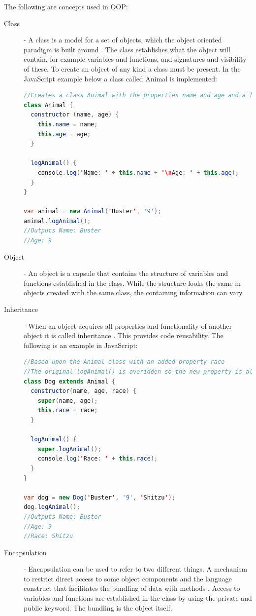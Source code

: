 \documentclass {article}
\begin{document}
The following are concepts used in OOP:
\begin{description}
\item [Class] - A class is a model for a set of objects, which the object oriented paradigm is built around \cite{gabmar}. The class establishes what the object will contain, for example variables and functions, and signatures and visibility of these. To create an object of any kind a class must be present. In the JavaScript example below a class called Animal is implemented:
 
\begin{lstlisting}[language=Java]
//Creates a class Animal with the properties name and age and a function for logging the properties to the screen
class Animal {
  constructor (name, age) {
    this.name = name;
    this.age = age;
  }
 
  logAnimal() {
    console.log('Name: ' + this.name + '\nAge: ' + this.age);
  }
}
 
var animal = new Animal('Buster', '9');
animal.logAnimal();
//Outputs Name: Buster
//Age: 9
\end{lstlisting}
\item [Object] - An object is a capsule that contains the structure of variables and functions established in the class\cite{gabmar, skansholm}. While the structure looks the same in objects created with the same class, the containing information can vary.
\item [Inheritance] - When an object acquires all properties and functionality of another object it is called inheritance \cite{skansholm}. This provides code reusability. The following is an example in JavaScript:
 
\begin{lstlisting}[language=Java, breaklines=true]
//Based upon the Animal class with an added property race
//The original logAnimal() is overidden so the new property is also logged to the screen.
class Dog extends Animal {
  constructor(name, age, race) {
    super(name, age);
    this.race = race;
  }
 
  logAnimal() {
    super.logAnimal();
    console.log('Race: ' + this.race);
  }
}
 
var dog = new Dog('Buster', '9', 'Shitzu');
dog.logAnimal();
//Outputs Name: Buster
//Age: 9
//Race: Shitzu
\end{lstlisting}
 
\item [Encapsulation] - Encapsulation can be used to refer to two different things. A mechanism to restrict direct access to some object components and the language construct that facilitates the bundling of data with methods \cite{gabmar, skansholm}. Access to variables and functions are established in the class by using the private and public keyword. The bundling is the object itself.
 

\end{description}
\end{document}
